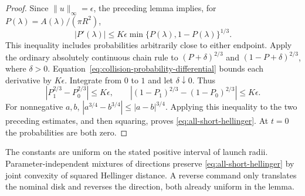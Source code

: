 \begin{proof}
Since $\|u\|_\infty=\epsilon$, the preceding lemma implies, for
$P(\lambda)=A(\lambda)/(\pi R^2)$,
\begin{equation}\label{eq:collision-probability-differential}
 |P'(\lambda)|\le K\epsilon
                   \min\{P(\lambda),1-P(\lambda)\}^{1/3}.
\end{equation}
This inequality includes probabilities arbitrarily close to either
endpoint. Apply the ordinary absolutely continuous chain rule to
$(P+\delta)^{2/3}$ and $(1-P+\delta)^{2/3}$, where $\delta>0$.
Equation~\eqref{eq:collision-probability-differential} bounds each
derivative by $K\epsilon$. Integrate from $0$ to $1$ and let
$\delta\downarrow0$. Thus
\[
 |P_1^{2/3}-P_0^{2/3}|\le K\epsilon,\qquad
 |(1-P_1)^{2/3}-(1-P_0)^{2/3}|\le K\epsilon.
\]
For nonnegative $a,b$, $|a^{3/4}-b^{3/4}|\le|a-b|^{3/4}$.
Applying this inequality to the two preceding estimates, and then
squaring, proves \eqref{eq:all-short-hellinger}. At $t=0$ the
probabilities are both zero.
\end{proof}

The constants are uniform on the stated positive interval of launch
radii. Parameter-independent mixtures of directions preserve
\eqref{eq:all-short-hellinger} by joint convexity of squared Hellinger
distance. A reverse command only translates the nominal disk and
reverses the direction, both already uniform in the lemma.

